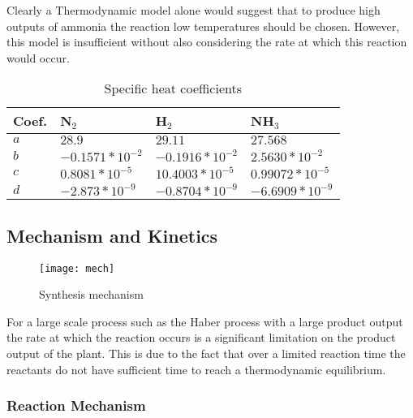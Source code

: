 Clearly a Thermodynamic model alone would suggest that to produce high outputs of ammonia the reaction low temperatures should be chosen. However, this model is insufficient without also considering the rate at which this reaction would occur. 
\begin{table}[!htbp]
	\caption{Specific heat coefficients \cite{Morgan2013} \label{tab:cpco}}
	
	\begin{center}
		\begin{tabular}{|l|l|l|l|}
			\hline
			Coef. & 
			N$_2$               & H$_2$               & NH$_3$              \\
			\hline
			$a$           & $28.9$               & $29.11$              & $27.568$             \\
			\hline
			$b$           & $-0.1571*10^{-2}$ & $-0.1916*10^{-2}$ & $2.5630*10^{-2}$  \\ \hline
			$c$           & $0.8081*10^{-5}$  & $10.4003*10^{-5}$  & $0.99072*10^{-5}$ \\
			\hline
			$d$           & $-2.873*10^{-9}$  & $-0.8704*10^{-9}$ & $-6.6909*10^{-9}$ \\
			\hline
		\end{tabular}
		
	\end{center}
\end{table}

\subsection{Mechanism and Kinetics}

\begin{wrapfigure}{r}{0.25\textwidth}
	{\centering	
		\texttt{[image: mech]}
		\caption{Synthesis mechanism \label{fig:mech}}
	}
\end{wrapfigure}
For a large scale process such as the Haber process with a large product output the rate at which the reaction occurs is a significant limitation on the product output of the plant. This is due to the fact that over a limited reaction time the reactants do not have sufficient time to reach a thermodynamic equilibrium.

\subsubsection{Reaction Mechanism}

